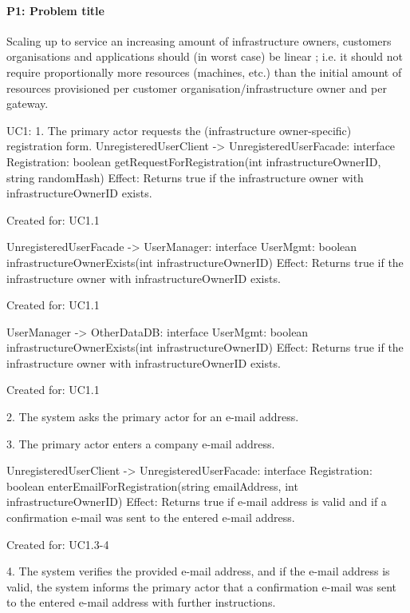     \paragraph{P1: Problem title}
        Scaling up to service an increasing amount of infrastructure owners,
        customers organisations and applications should (in worst case) be linear ;
        i.e. it should not require proportionally more resources (machines, etc.)
        than the initial amount of resources provisioned per customer
        organisation/infrastructure owner and per gateway.


    UC1:
        1. The primary actor requests the (infrastructure owner-specific) registration form.
            UnregisteredUserClient -> UnregisteredUserFacade: interface Registration: boolean getRequestForRegistration(int infrastructureOwnerID, string randomHash)
                Effect: Returns true if the infrastructure owner with infrastructureOwnerID exists.
                \item Created for: UC1.1

            UnregisteredUserFacade -> UserManager: interface UserMgmt: boolean infrastructureOwnerExists(int infrastructureOwnerID)
                Effect: Returns true if the infrastructure owner with infrastructureOwnerID exists.
                \item Created for: UC1.1

            UserManager -> OtherDataDB: interface UserMgmt: boolean infrastructureOwnerExists(int infrastructureOwnerID)
                Effect: Returns true if the infrastructure owner with infrastructureOwnerID exists.
                \item Created for: UC1.1

        2. The system asks the primary actor for an e-mail address.

        3. The primary actor enters a company e-mail address.

            UnregisteredUserClient -> UnregisteredUserFacade: interface Registration: boolean enterEmailForRegistration(string emailAddress, int infrastructureOwnerID)
                Effect: Returns true if e-mail address is valid and if a confirmation e-mail was sent to the entered e-mail address.
                \item Created for: UC1.3-4

       4. The system verifies the provided e-mail address, and if the e-mail address is valid, the system
          informs the primary actor that a confirmation e-mail was sent to the entered e-mail address
          with further instructions.

